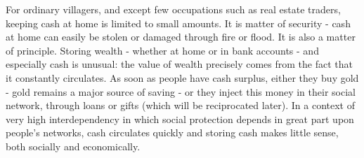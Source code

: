 \documentclass[a4paper, 11pt, onecolumn]{article}
\begin{document}
For ordinary villagers, and except few occupations such as real estate traders, keeping cash at home is limited to small amounts. It is matter of security - cash at home can easily be stolen or damaged through fire or flood. It is also a matter of principle. Storing wealth - whether at home or in bank accounts - and especially cash is unusual: the value of wealth precisely comes from the fact that it constantly circulates. As soon as people have cash surplus, either they buy gold - gold remains a major source of saving - or they inject this money in their social network, through loans or gifts (which will be reciprocated later). In a context of very high interdependency in which social protection depends in great part upon people's networks, cash circulates quickly and storing cash makes little sense, both socially and economically. 
\end{document}
